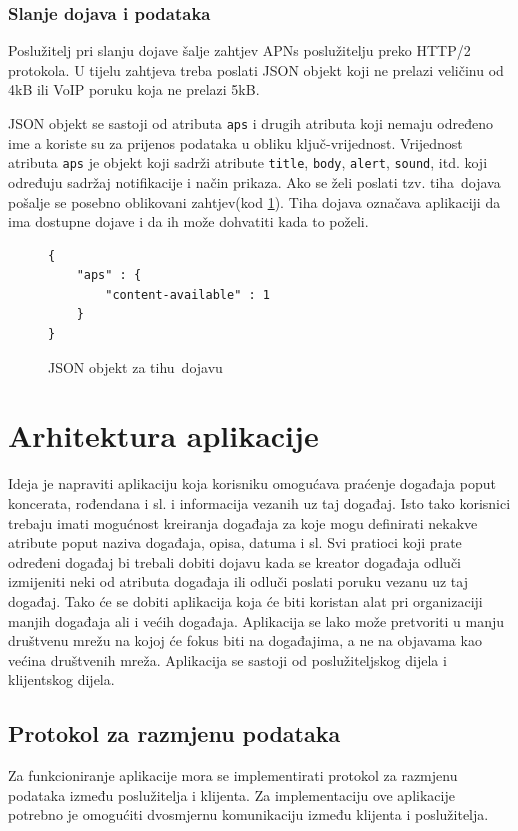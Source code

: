 \documentclass[times, utf8, zavrsni]{fer}
\begin{document}
\subsection{Slanje dojava i podataka}
Poslužitelj pri slanju dojave šalje zahtjev APNs poslužitelju preko HTTP/2 protokola. U tijelu zahtjeva treba poslati JSON objekt koji ne prelazi veličinu od 4kB ili 	VoIP poruku koja ne prelazi 5kB.

JSON objekt se sastoji od atributa {\tt aps} i drugih atributa koji nemaju određeno ime a koriste su za prijenos podataka u obliku ključ-vrijednost. Vrijednost atributa {\tt aps} je objekt koji sadrži atribute {\tt title}, {\tt body}, {\tt alert}, {\tt sound}, itd. koji određuju sadržaj notifikacije i način prikaza. Ako se želi poslati tzv. \glqq tiha\grqq\  dojava pošalje se posebno oblikovani zahtjev(kod \ref{lst:tiha-dojava}). Tiha dojava označava aplikaciji da ima dostupne dojave i da ih može dohvatiti kada to poželi.\citep{apns2017}

\begin{figure}[t!]
\begin{lstlisting}
{
    "aps" : {
        "content-available" : 1
    }
}
\end{lstlisting}
\caption{JSON objekt za \glqq tihu\grqq\  dojavu}
\label{lst:tiha-dojava}
\end{figure}

\chapter{Arhitektura aplikacije}
\label{chp:architecture}

Ideja je napraviti aplikaciju koja korisniku omogućava praćenje događaja poput koncerata, rođendana i sl. i informacija vezanih uz taj događaj. Isto tako korisnici trebaju imati mogućnost kreiranja događaja za koje mogu definirati nekakve atribute poput naziva događaja, opisa, datuma i sl. Svi pratioci koji prate određeni događaj bi trebali dobiti dojavu kada se kreator događaja odluči izmijeniti neki od atributa događaja ili odluči poslati poruku vezanu uz taj događaj. Tako će se dobiti aplikacija koja će biti koristan alat pri organizaciji manjih događaja ali i većih događaja. Aplikacija se lako može pretvoriti u manju društvenu mrežu na kojoj će fokus biti na događajima, a ne na objavama kao većina društvenih mreža. Aplikacija se sastoji od poslužiteljskog dijela i klijentskog dijela.

\section{Protokol za razmjenu podataka}
Za funkcioniranje aplikacije mora se implementirati protokol za razmjenu podataka između poslužitelja i klijenta. Za implementaciju ove aplikacije potrebno je omogućiti dvosmjernu komunikaciju između klijenta i poslužitelja.
\end{document}
